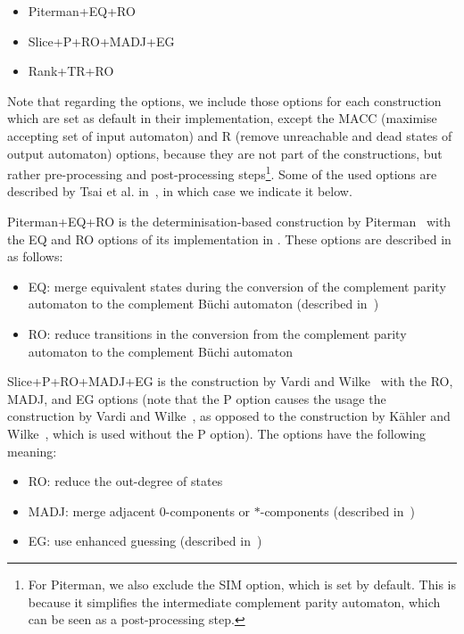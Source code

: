 \begin{itemize}
\item Piterman+EQ+RO
\item Slice+P+RO+MADJ+EG
\item Rank+TR+RO
\end{itemize}

Note that regarding the options, we include those options for each construction which are set as default in their implementation, except the MACC (maximise accepting set of input automaton) and R (remove unreachable and dead states of output automaton) options, because they are not part of the constructions, but rather pre-processing and post-processing steps\footnote{For Piterman, we also exclude the SIM option, which is set by default. This is because it simplifies the intermediate complement parity automaton, which can be seen as a post-processing step.}. Some of the used options are described by Tsai et al. in~\cite{2011_tsai}, in which case we indicate it below.

Piterman+EQ+RO is the determinisation-based construction by Piterman~\cite{2006_piterman,2007_piterman} with the EQ and RO options of its implementation in \goal. These options are described in \goal{} as follows:
\begin{itemize}
\item EQ: merge equivalent states during the conversion of the complement parity automaton to the complement Büchi automaton (described in~\cite{2011_tsai})
\item RO: reduce transitions in the conversion from the complement parity automaton to the complement Büchi automaton
\end{itemize}

Slice+P+RO+MADJ+EG is the construction by Vardi and Wilke~\cite{vardi2007automata} with the RO, MADJ, and EG options (note that the P option causes the usage the construction by Vardi and Wilke~\cite{vardi2007automata}, as opposed to the construction by Kähler and Wilke~\cite{2008_kaehler}, which is used without the P option). The options have the following meaning:
\begin{itemize}
\item RO: reduce the out-degree of states
\item MADJ: merge adjacent 0-components or $*$-components (described in~\cite{2011_tsai})
\item EG: use enhanced guessing (described in~\cite{2011_tsai})
\end{itemize}

